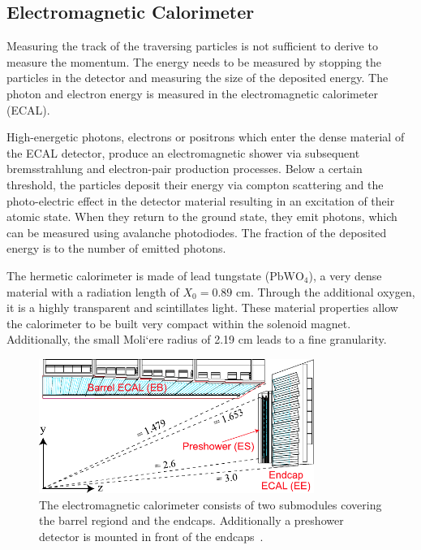 \subsection{Electromagnetic Calorimeter}

Measuring the track of the traversing particles is not sufficient to derive to
measure the momentum. The energy needs to be measured by stopping the particles
in the detector and measuring the size of the deposited energy. The photon and
electron energy is measured in the electromagnetic calorimeter (ECAL). 

High-energetic photons, electrons or positrons which enter the dense material of the ECAL
detector, produce an electromagnetic shower via subsequent bremsstrahlung and
electron-pair production processes. Below a certain threshold, the particles
deposit their energy via compton scattering and the photo-electric effect in the
detector material resulting in an excitation of their atomic state. When they
return to the ground state, they emit photons, which can be measured using
avalanche photodiodes. The fraction of the deposited energy is to the number of
emitted photons.

The hermetic calorimeter is made of lead tungstate ($\mathrm{PbWO}_4$), a very
dense material with a radiation length of $X_0 = 0.89$ cm. Through the
additional oxygen, it is a highly transparent and scintillates light. These
material properties allow the calorimeter to be built very compact within the
solenoid magnet. Additionally, the small Moli`ere  radius of 2.19 cm leads to a
fine granularity. 

\begin{figure}[htp]
    \centering
    \includegraphics[width=0.8\textwidth]{figures/cms_detector/cms_ecal.pdf}\hfill
    \caption[Electromagnetic Calorimeter]{The electromagnetic calorimeter
    consists of two submodules covering the barrel regiond and the endcaps.
    Additionally a preshower detector is mounted in front of the
    endcaps~\cite{cms:ecal}.}
    \label{fig:cms:ecal}
\end{figure}

